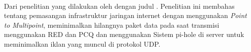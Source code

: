\documentclass[../PROPOSAL_PRA_SKRIPSI_ALDZIKRI_DWIJAYANTO_PRATHAMA.tex]{subfiles}
\begin{document}
  \paragraph*{} Dari penelitian yang dilakukan oleh
  \cite{habibi2022} dengan judul .
  Penelitian ini membahas tentang pemasangan infrastruktur
  jaringan internet dengan menggunakan \textit{Point to
  Multipoint}, meminimalkan hilangnya paket data pada saat
  transmisi menggunakan RED dan PCQ dan menggunakan Sistem
  pi-hole di server untuk meminimalkan iklan yang muncul di
  protokol UDP.
\end{document}
